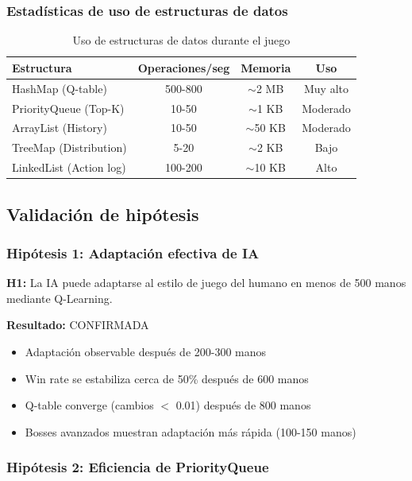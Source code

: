 \documentclass[12pt,a4paper]{article}
\begin{document}
\subsubsection{Estadísticas de uso de estructuras de datos}

\begin{table}[H]
\centering
\begin{tabular}{|l|c|c|c|}
\hline
\textbf{Estructura} & \textbf{Operaciones/seg} & \textbf{Memoria} & \textbf{Uso} \\
\hline
HashMap (Q-table) & 500-800 & $\sim$2 MB & Muy alto \\
PriorityQueue (Top-K) & 10-50 & $\sim$1 KB & Moderado \\
ArrayList (History) & 10-50 & $\sim$50 KB & Moderado \\
TreeMap (Distribution) & 5-20 & $\sim$2 KB & Bajo \\
LinkedList (Action log) & 100-200 & $\sim$10 KB & Alto \\
\hline
\end{tabular}
\caption{Uso de estructuras de datos durante el juego}
\end{table}

\subsection{Validación de hipótesis}

\subsubsection{Hipótesis 1: Adaptación efectiva de IA}

\textbf{H1:} La IA puede adaptarse al estilo de juego del humano en menos de 500 manos mediante Q-Learning.

\textbf{Resultado:} CONFIRMADA
\begin{itemize}
    \item Adaptación observable después de 200-300 manos
    \item Win rate se estabiliza cerca de 50\% después de 600 manos
    \item Q-table converge (cambios $<$ 0.01) después de 800 manos
    \item Bosses avanzados muestran adaptación más rápida (100-150 manos)
\end{itemize}

\subsubsection{Hipótesis 2: Eficiencia de PriorityQueue}
\end{document}
